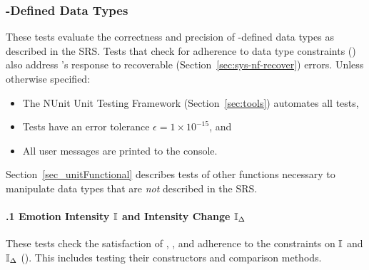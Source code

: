 \subsubsection{\progname{}-Defined Data Types}\label{sec_sysDataTypes}
These tests evaluate the correctness and precision of \progname{}-defined data
types as described in the SRS. Tests that check for adherence to data type
constraints () also address \progname{}'s response to recoverable
(Section~\ref{sec:sys-nf-recover}) %
 errors. Unless otherwise specified:
\begin{itemize}
    \item The NUnit Unit Testing Framework (Section~\ref{sec:tools}) automates
    all tests,
    \item Tests have an error tolerance $\epsilon = 1 \times 10^{-15}$, and
    \item All user messages are printed to the console.
\end{itemize}

\noindent Section~\ref{sec_unitFunctional} describes tests of other functions
necessary to manipulate data types that are \textit{not} described in the SRS.

\paragraph{\thesubsubsection.1 Emotion Intensity $\mathbb{I}$ and
Intensity Change
$\mathbb{I}_{\Delta}$}\label{sec_IntensityAndIntensityChg}
These tests check the satisfaction of ,
, and adherence to the constraints on
$\mathbb{I}$ and $\mathbb{I}_{\Delta}$ (). This includes
testing their constructors and comparison methods.

